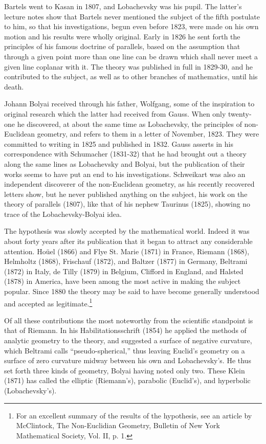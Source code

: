 \documentclass[oneside]{book}
\begin{document}
{Bartels went to Kasan in 1807, and Lobachevsky was his pupil. The
latter's lecture notes show that Bartels never mentioned the subject
of the fifth postulate to him, so that his investigations, begun
even before 1823, were made on his own motion and his results were
wholly original. Early in 1826 he sent forth the principles of his
famous doctrine of parallels, based on the assumption that through a
given point more than one line can be drawn which shall never meet a
given line coplanar with it. The theory was published in full in
1829-30, and he contributed to the subject, as well as to other
branches of mathematics, until his death.

Johann Bolyai received through his father, Wolfgang, some of the
inspiration to original research which the latter had received from
Gauss. When only twenty-one he discovered, at about the same time as
Lobachevsky, the principles of non-Euclidean geometry, and refers to
them in a letter of November, 1823. They were committed to writing
in 1825 and published in 1832. Gauss asserts in his correspondence
with Schumacher (1831-32) that he had brought out a theory along the
same lines as Lobachevsky and Bolyai, but the publication of their
works seems to have put an end to his investigations. Schweikart
was also an independent discoverer of the non-Euclidean geometry, as
his recently recovered letters show, but he never published anything
on the subject, his work on the theory of parallels (1807), like
that of his nephew Taurinus (1825), showing no trace of the
Lobachevsky-Bolyai idea.

The hypothesis was slowly accepted by the mathematical world. Indeed
it was about forty years after its publication that it began to
attract any considerable attention. Ho\"uel (1866) and Flye
St. Marie (1871) in France, Riemann (1868), Helmholtz (1868),
Frischauf (1872), and Baltzer (1877) in Germany, Beltrami (1872) in
Italy, de Tilly (1879) in Belgium, Clifford in England, and Halsted
(1878) in America, have been among the most active in making the
subject popular. Since 1880 the theory may be said to have become
generally understood and accepted as legitimate.\footnote{For an
excellent summary of the results of the hypothesis, see an article
by McClintock, The Non-Euclidian Geometry, Bulletin of New York
Mathematical Society, Vol. II, p. 1.}

Of all these contributions the most noteworthy from the scientific
standpoint is that of Riemann. In his Habilitationsschrift (1854)
he applied the methods of analytic geometry to the theory, and
suggested a surface of negative curvature, which Beltrami calls
``pseudo-spherical,'' thus leaving Euclid's geometry on a surface of
zero curvature midway between his own and Lobachevsky's. He thus set
forth three kinds of geometry, Bolyai having noted only two. These
Klein (1871) has called the elliptic (Riemann's), parabolic
(Euclid's), and hyperbolic (Lobachevsky's).

}
\end{document}
